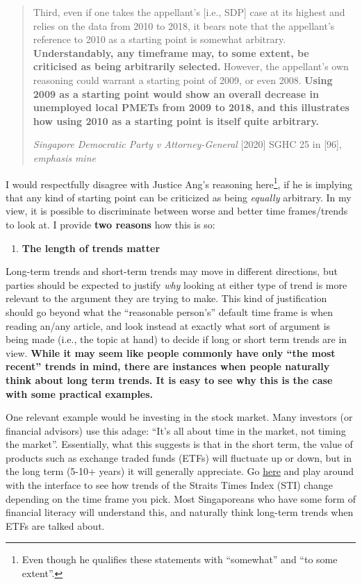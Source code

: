\documentclass[
  openany]{book}
\providecommand{\tightlist}{%
  \setlength{\itemsep}{0pt}\setlength{\parskip}{0pt}}
\begin{document}
\begin{quote}
Third, even if one takes the appellant's {[}i.e., SDP{]} case at its highest and relies on the data from 2010 to 2018, it bears note that the appellant's reference to 2010 as a starting point is somewhat arbitrary. \textbf{Understandably, any timeframe may, to some extent, be criticised as being arbitrarily selected.} However, the appellant's own reasoning could warrant a starting point of 2009, or even 2008. \textbf{Using 2009 as a starting point would show an overall decrease in unemployed local PMETs from 2009 to 2018, and this illustrates how using 2010 as a starting point is itself quite arbitrary.}

\emph{Singapore Democratic Party v Attorney-General} {[}2020{]} SGHC 25 in {[}96{]}, \emph{emphasis mine}
\end{quote}

I would respectfully disagree with Justice Ang's reasoning here\footnote{Even though he qualifies these statements with ``somewhat'' and ``to some extent''.}, if he is implying that any kind of starting point can be criticized as being \emph{equally} arbitrary. In my view, it is possible to discriminate between worse and better time frames/trends to look at. I provide \textbf{two reasons} how this is so:

\begin{enumerate}
\def\labelenumi{\arabic{enumi}.}
\tightlist
\item
  \textbf{The length of trends matter}
\end{enumerate}

Long-term trends and short-term trends may move in different directions, but parties should be expected to justify \emph{why} looking at either type of trend is more relevant to the argument they are trying to make. This kind of justification should go beyond what the ``reasonable person's'' default time frame is when reading an/any article, and look instead at exactly what sort of argument is being made (i.e., the topic at hand) to decide if long or short term trends are in view. \textbf{While it may seem like people commonly have only ``the most recent'' trends in mind, there are instances when people naturally think about long term trends. It is easy to see why this is the case with some practical examples.}

One relevant example would be investing in the stock market. Many investors (or financial advisors) use this adage: ``It's all about time in the market, not timing the market''. Essentially, what this suggests is that in the short term, the value of products such as exchange traded funds (ETFs) will fluctuate up or down, but in the long term (5-10+ years) it will generally appreciate. Go \href{https://www2.sgx.com/indices/products/sti}{here} and play around with the interface to see how trends of the Straits Times Index (STI) change depending on the time frame you pick. Most Singaporeans who have some form of financial literacy will understand this, and naturally think long-term trends when ETFs are talked about.
\end{document}
